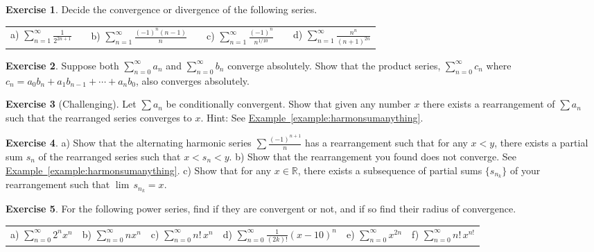 \documentclass[12pt]{book}
\newcommand{\R}{{\mathbb{R}}}
\theoremstyle{plain}
\theoremstyle{remark}
\theoremstyle{definition}
\theoremstyle{exercise}
\newtheorem{exercise}{Exercise}[section]
\theoremstyle{example}
\newcommand{\exampleref}[1]{\hyperref[#1]{Example~\ref*{#1}}}
\begin{document}
\begin{exercise}
Decide the convergence or divergence of the following series.

\medskip

\noindent
\begin{tabular}{lllllll}
a)
$\displaystyle \sum_{n=1}^\infty \frac{1}{2^{2n+1}}$
& &
b)
$\displaystyle \sum_{n=1}^\infty \frac{{(-1)}^{n}(n-1)}{n}$
& &
c)
$\displaystyle \sum_{n=1}^\infty \frac{{(-1)}^n}{n^{1/10}}$
& &
d)
$\displaystyle \sum_{n=1}^\infty \frac{n^n}{{(n+1)}^{2n}}$
\end{tabular}
\end{exercise}

\begin{exercise}
Suppose both $\sum_{n=0}^\infty a_n$ and $\sum_{n=0}^\infty b_n$ 
converge absolutely.
Show that the product series, $\sum_{n=0}^\infty c_n$ where
$c_n = a_0 b_n + a_1 b_{n-1} + \cdots + a_n b_0$, also converges absolutely.
\end{exercise}

\begin{exercise}[Challenging] \label{exercise:seriesconvergestoanything}
Let $\sum a_n$ be conditionally convergent.
Show that given any number $x$
there exists a rearrangement of $\sum a_n$
such that the rearranged series converges to $x$.
Hint: See \exampleref{example:harmonsumanything}.
\end{exercise}

\begin{exercise}
a) Show that the alternating harmonic series $\sum
\frac{{(-1)}^{n+1}}{n}$ has a rearrangement
such that for any $x < y$, there exists a partial sum $s_n$
of the rearranged series such that $x < s_n < y$.
b) Show that the rearrangement you found does not converge.
See \exampleref{example:harmonsumanything}.
c) Show that for any $x \in \R$, there exists a subsequence of
partial sums $\{ s_{n_k} \}$ of your rearrangement such that 
$\lim \, s_{n_k} = x$.
\end{exercise}

\begin{exercise}
For the following power series, find if they are convergent or not, and
if so find their radius of convergence.

\medskip

\noindent
\begin{tabular}{llllll}
a)
$\displaystyle \sum_{n=0}^\infty 2^n x^n$
&
b) $\displaystyle \sum_{n=0}^\infty n x^n$
& 
c) 
$\displaystyle \sum_{n=0}^\infty n! \, x^n$
&
d) $\displaystyle \sum_{n=0}^\infty \frac{1}{(2k)!} {(x-10)}^n$
&
e) $\displaystyle \sum_{n=0}^\infty x^{2n}$
&
f) $\displaystyle \sum_{n=0}^\infty n! \, x^{n!}$
\end{tabular}
\end{exercise}
\end{document}
